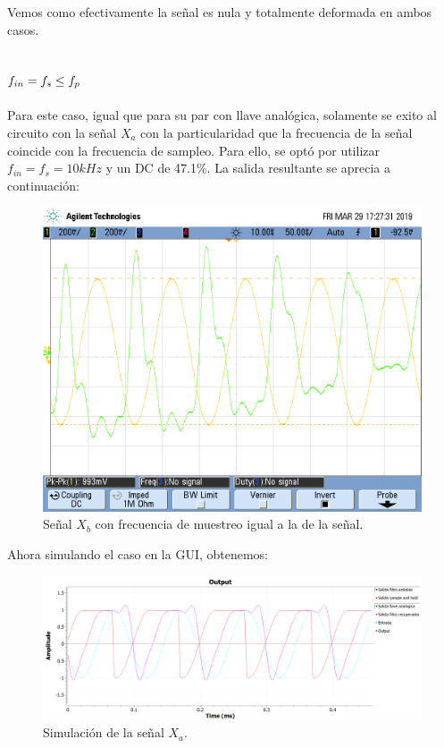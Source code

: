 \documentclass[../../ASSD_TP1_G7.tex]{subfiles}
\begin{document}
Vemos como efectivamente la señal es nula y totalmente deformada en
ambos casos.

\subsection{$f_{in}=f_{s}\protect\leq f_{p}$}

Para este caso, igual que para su par con llave analógica, solamente
se exito al circuito con la señal $X_{a}$ con la particularidad que
la frecuencia de la señal coincide con la frecuencia de sampleo. Para
ello, se optó por utilizar $f_{in}=f_{s}=10kHz$ y un DC de 47.1\%.
La salida resultante se aprecia a continuación:

\begin{figure}[H]

\begin{centering}
\includegraphics[scale=0.3]{Imagenes/yh_pt6c_sin2}\caption{Señal $X_{b}$ con frecuencia de muestreo igual a la de la señal.}
\par\end{centering}
\end{figure}

Ahora simulando el caso en la GUI, obtenemos:

\begin{figure}[H]
\begin{centering}
\includegraphics[scale=0.5]{Imagenes/simulacion_syh_seno_c.PNG}\caption{Simulación de la señal $X_{a}$.}
\par\end{centering}
\end{figure}
\end{document}
